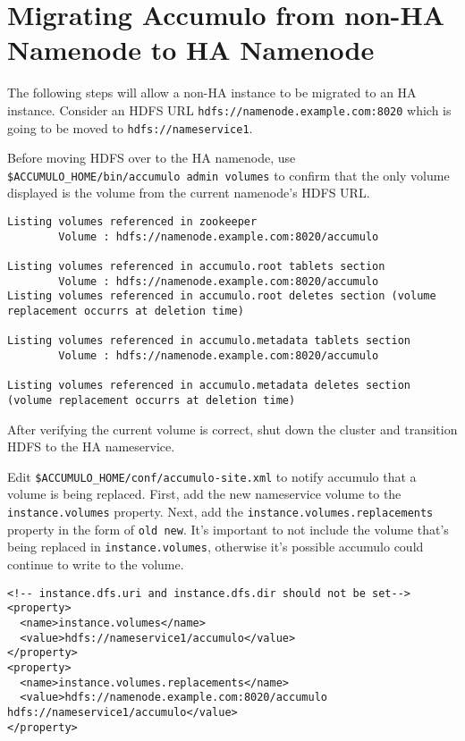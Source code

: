 \section{Migrating Accumulo from non-HA Namenode to HA Namenode}

The following steps will allow a non-HA instance to be migrated to an HA instance. Consider an HDFS URL
\texttt{hdfs://namenode.example.com:8020} which is going to be moved to \texttt{hdfs://nameservice1}.

Before moving HDFS over to the HA namenode, use \texttt{\$ACCUMULO\_HOME/bin/accumulo admin volumes} to confirm
that the only volume displayed is the volume from the current namenode's HDFS URL.

\begingroup\fontsize{8pt}{8pt}\selectfont\begin{verbatim}
Listing volumes referenced in zookeeper
        Volume : hdfs://namenode.example.com:8020/accumulo

Listing volumes referenced in accumulo.root tablets section
        Volume : hdfs://namenode.example.com:8020/accumulo
Listing volumes referenced in accumulo.root deletes section (volume replacement occurrs at deletion time)

Listing volumes referenced in accumulo.metadata tablets section
        Volume : hdfs://namenode.example.com:8020/accumulo

Listing volumes referenced in accumulo.metadata deletes section (volume replacement occurrs at deletion time)
\end{verbatim}

After verifying the current volume is correct, shut down the cluster and transition HDFS to the HA nameservice.

Edit \texttt{\$ACCUMULO\_HOME/conf/accumulo-site.xml} to notify accumulo that a volume is being replaced. First,
add the new nameservice volume to the \texttt{instance.volumes} property. Next, add the
\texttt{instance.volumes.replacements} property in the form of \texttt{old new}. It's important to not include
the volume that's being replaced in \texttt{instance.volumes}, otherwise it's possible accumulo could continue
to write to the volume.

\begingroup\fontsize{8pt}{8pt}\selectfont\begin{verbatim}
<!-- instance.dfs.uri and instance.dfs.dir should not be set-->
<property>
  <name>instance.volumes</name>
  <value>hdfs://nameservice1/accumulo</value>
</property>
<property>
  <name>instance.volumes.replacements</name>
  <value>hdfs://namenode.example.com:8020/accumulo hdfs://nameservice1/accumulo</value>
</property>
\end{verbatim}

